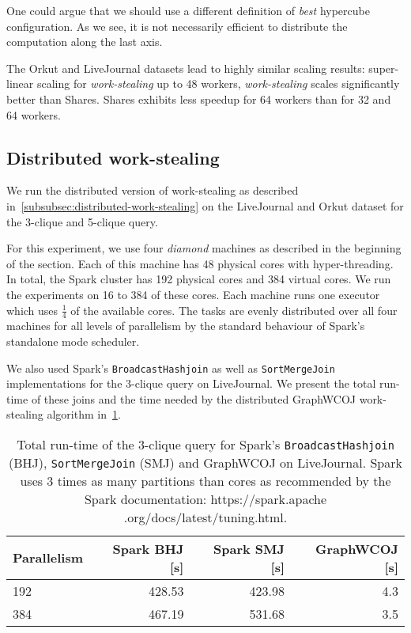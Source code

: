 One could argue that we should use a different definition of \textit{best} hypercube configuration.
As we see, it is not necessarily efficient to distribute the computation along the last axis.

The Orkut and LiveJournal datasets lead to highly similar scaling results:
super-linear scaling for \textit{work-stealing} up to 48 workers,
\textit{work-stealing} scales significantly better than Shares.
Shares exhibits less speedup for 64 workers than for 32 and 64 workers.

\subsection{Distributed work-stealing}\label{subsec:distributed-work-stealing}
We run the distributed version of work-stealing as described in~\cref{subsubsec:distributed-work-stealing}
on the LiveJournal and Orkut dataset for the 3-clique and 5-clique query.

For this experiment, we use four \textit{diamond} machines as described in the beginning of the section.
Each of this machine has 48 physical cores with hyper-threading.
In total, the Spark cluster has 192 physical cores and 384 virtual cores.
We run the experiments on 16 to 384 of these cores.
Each machine runs one executor which uses $\frac{1}{4}$ of the available cores.
The tasks are evenly distributed over all four machines for all levels of parallelism by
the standard behaviour of Spark's standalone mode scheduler.

We also used Spark's \texttt{BroadcastHashjoin} as well as \texttt{SortMergeJoin} implementations
for the 3-clique query on LiveJournal.
We present the total run-time of these joins and the time needed by the distributed GraphWCOJ work-stealing
algorithm in~\cref{table:spark-vs-distributed-work-stealing}.

\begin{table}
	\centering
    \begin{tabular}{lrrr}
        \toprule
        Parallelism & Spark BHJ [s] & Spark SMJ [s] & GraphWCOJ [s] \\ \midrule
        192         &  428.53       &  423.98       &  4.3          \\
        384         &  467.19       &  531.68       &  3.5          \\
        \bottomrule
    \end{tabular}
    \caption{
    	Total run-time of the 3-clique query for Spark's \texttt{BroadcastHashjoin} (BHJ),
    	\texttt{SortMergeJoin} (SMJ) and GraphWCOJ on LiveJournal.
    	    	Spark uses 3 times as many partitions than cores as recommended by the Spark documentation: https://spark.apache
    .org/docs/latest/tuning.html.}
    \label{table:spark-vs-distributed-work-stealing}
\end{table}


